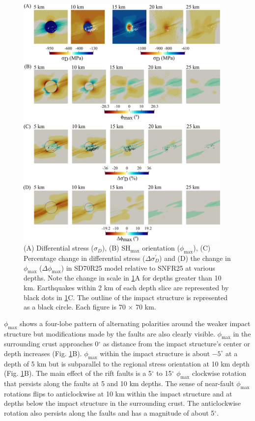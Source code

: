 \documentclass[draft]{agujournal2018}
\begin{document}
\begin{figure}[ht]
\centering
\includegraphics[width=25pc]{Figures/SD70R25_2.png}
\caption{(A) Differential stress ($\sigma_D$), (B) SH$_{\max}$ orientation ($\phi_{\max}$), (C) Percentage change in differential stress  ($\Delta\sigma_{D}^{\prime}$) and (D) the change in $\phi_{\max}$ ($\Delta\phi_{\max}$) in SD70R25 model relative to SNFR25 at various depths. Note the change in scale in \ref{fig:SD70R25}A for depths greater than 10 km. Earthquakes within 2 km of each depth slice are represented by black dots in \ref{fig:SD70R25}C. The outline of the impact structure is represented as a black circle. Each figure is 70 $\times$ 70 km.}
\label{fig:SD70R25}
\end{figure}

$\phi_{\max}$ shows a four-lobe pattern of alternating polarities around the weaker impact structure but modifications made by the faults are also clearly visible. $\phi_{\max}$ in the surrounding crust approaches 0$^\circ$ as distance from the impact structure's center or depth increases (Fig. \ref{fig:SD70R25}B). $\phi_{\max}$ within the impact structure is about $-5^{\circ}$ at a depth of 5 km but is subparallel to the regional stress orientation at 10 km depth (Fig. \ref{fig:SD70R25}B). The main effect of the rift faults is a 5$^{\circ}$ to 15$^{\circ}$ $\phi_{\max}$ clockwise rotation that persists along the faults at 5 and 10 km depths. The sense of near-fault $\phi_{\max}$ rotations flips to anticlockwise at 10 km within the impact structure and at depths below the impact structure in the surrounding crust. The anticlockwise rotation also persists along the faults and has a magnitude of about 5$^{\circ}$.
\end{document}
